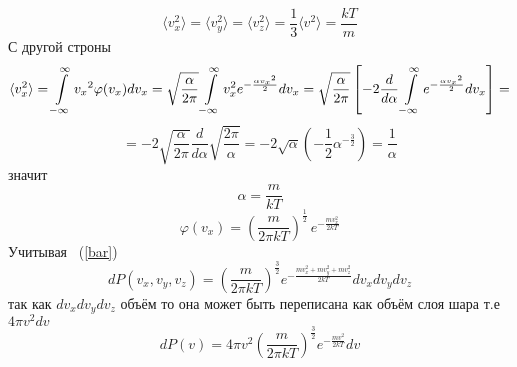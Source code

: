 			$$\langle v_x^2 \rangle = \langle v_y^2 \rangle = \langle v_z^2 \rangle = \frac{1}{3} \langle v^2 \rangle = \frac{kT}{m}$$
		С другой строны
	$$\langle v_x^2 \rangle = \int\limits_{-\infty} ^ {\infty} {v_x}^2  \varphi(v_x)  dv_x = \sqrt{\frac{\alpha}{2 \pi}}  \int\limits_{-\infty} ^ {\infty} v_x^2  e^{-\frac{\alpha {v_x}^2}{2}}  dv_x = \sqrt{\frac{\alpha}{2 \pi}}\left[ -2  \frac{d}{d \alpha} \int\limits_{-\infty} ^ {\infty} e^{-\frac{\alpha {v_x}^2}{2}}  dv_x \right] \hm=$$  $$ = -2  \sqrt{\frac{\alpha}{2 \pi}}  \frac{d}{d \alpha} \sqrt{\frac{2 \pi}{\alpha}} = - 2 \sqrt{\alpha} \left(-\frac{1}{2} \alpha^{-\frac{3}{2}}\right) = \frac{1}{\alpha}$$
	значит
	$$\alpha = \frac{m}{kT}$$
	$$\varphi (v_x) = \left(\frac{m}{2\pi kT}\right)^{\frac{1}{2}} \, e^{-\frac{mv_x^2}{2kT}}$$
	Учитывая  ~(\ref{bar})
	$$dP (v_x, v_y, v_z) = \left(\frac{m}{2\pi kT}\right)^{\frac{3}{2}} e^{-\frac{mv_x^2 + mv_y^2 + mv_z^2}{2kT}}{dv_x dv_y dv_z}$$
	так как $dv_x dv_y dv_z$ объём то она может быть переписана как объём слоя шара т.е $4\pi v^2 dv$
	$$dP(v) = 4\pi  v^ 2\left(\frac{m}{2\pi kT}\right)^{\frac{3}{2}} e^{-\frac{mv^2}{2kT}} dv$$